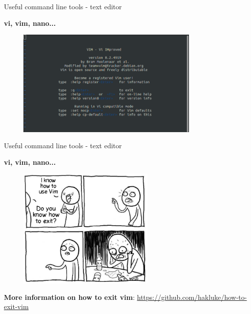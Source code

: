 \documentclass[10pt]{beamer}
\begin{document}
\begin{frame}[fragile]{Useful command line tools - text editor}

\textbf{vi, vim\footnotemark, nano\footnotemark... }

\begin{figure}[!ht]
\centering
\includegraphics[width = 0.8\textwidth]{images/vi.png}
\end{figure}


\end{frame}

\begin{frame}[fragile]{Useful command line tools - text editor}

\textbf{vi, vim, nano... }

\begin{figure}[!ht]
\centering
\includegraphics[width = 0.6\textwidth]{images/vim_meme.jpg}
\end{figure}

\scriptsize{\textbf{More information on how to exit vim}: \underline{https://github.com/hakluke/how-to-exit-vim}}

\end{frame}
\end{document}
